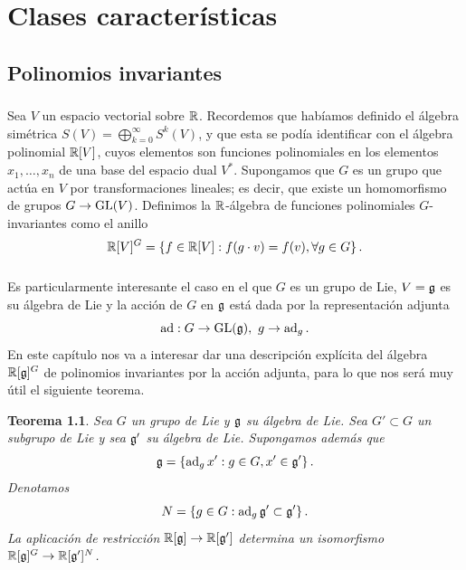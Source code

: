 \documentclass[11pt,a4paper]{amsbook}
\newtheorem{thm}[subsection]{Teorema}
\theoremstyle{remark} \newtheorem{rmk}[subsection]{Observación}
\theoremstyle{definition} \newtheorem{defn}[subsection]{Definición}
\theoremstyle{definition} \newtheorem{ex}[subsection]{Ejemplo}
\theoremstyle{definition} \newtheorem{ej}[subsection]{Ejercicio}
\begin{document}
\chapter{Clases características}

\section{Polinomios invariantes}
\subsection{} Sea $V$ un espacio vectorial sobre $\mathbb R$. Recordemos que habíamos definido el álgebra simétrica $S(V)=\bigoplus_{k=0}^\infty S^k(V)$, y que esta se podía identificar con el álgebra polinomial $\mathbb R[V]$, cuyos elementos son funciones polinomiales en los elementos $x_1,\dots,x_n$ de una base del espacio dual $V^*$. Supongamos que $G$ es un grupo que actúa en $V$ por transformaciones lineales; es decir, que existe un homomorfismo de grupos $G\rightarrow \operatorname{GL}(V)$. Definimos la $\mathbb R$-álgebra de funciones polinomiales $G$-invariantes como el anillo
\begin{equation*}
\mathbb R[V]^G = \left\{ f\in \mathbb R[V]: f(g\cdot v) = f(v), \forall g\in G \right\}.
\end{equation*}

\subsection{} Es particularmente interesante el caso en el que $G$ es un grupo de Lie, $V=\mathfrak{g}$ es su álgebra de Lie y la acción de $G$ en $\mathfrak{g}$ está dada por la representación adjunta
\begin{equation*}
\mathrm{ad}: G \rightarrow \operatorname{GL}(\mathfrak{g}),\ g \rightarrow \operatorname{ad}_g.
\end{equation*}
En este capítulo nos va a interesar dar una descripción explícita del álgebra $\mathbb R[\mathfrak{g}]^G$ de polinomios invariantes por la acción adjunta, para lo que nos será muy útil el siguiente teorema.

\begin{thm}
  Sea $G$ un grupo de Lie y $\mathfrak{g}$ su álgebra de Lie. Sea $G'\subset G$ un subgrupo de Lie y sea $\mathfrak{g}'$ su álgebra de Lie. Supongamos además que
  \begin{equation*}
\mathfrak{g}= \left\{ \operatorname{ad}_g x': g \in G, x'\in \mathfrak{g}'  \right\}.
  \end{equation*}
  Denotamos
  \begin{equation*}
N=\left\{ g \in G: \operatorname{ad}_g \mathfrak{g}' \subset \mathfrak{g}' \right\}.
  \end{equation*}
La aplicación de restricción $\mathbb R[\mathfrak{g}] \rightarrow \mathbb R[\mathfrak{g}']$ determina un isomorfismo $\mathbb R[\mathfrak{g}]^G \rightarrow \mathbb R[\mathfrak{g}']^N$.
\end{thm}
\end{document}

